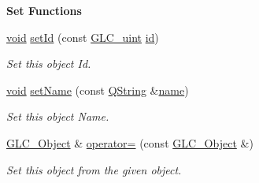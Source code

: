 \begin{Indent}{\bf Set Functions}\par
\begin{DoxyCompactItemize}
\item 
\hyperlink{group___u_a_v_objects_plugin_ga444cf2ff3f0ecbe028adce838d373f5c}{void} \hyperlink{class_g_l_c___object_a4cfaa3b2d34169a3b39912ca953d9042}{set\-Id} (const \hyperlink{glc__global_8h_abf950976fabed69026558df8e2da6c6b}{G\-L\-C\-\_\-uint} \hyperlink{glext_8h_a58c2a664503e14ffb8f21012aabff3e9}{id})
\begin{DoxyCompactList}\small\item\em Set this object Id. \end{DoxyCompactList}\item 
\hyperlink{group___u_a_v_objects_plugin_ga444cf2ff3f0ecbe028adce838d373f5c}{void} \hyperlink{class_g_l_c___object_a8a6dad86d79d8353056106f4d1cc099b}{set\-Name} (const \hyperlink{group___u_a_v_objects_plugin_gab9d252f49c333c94a72f97ce3105a32d}{Q\-String} \&\hyperlink{glext_8h_ad977737dfc9a274a62741b9500c49a32}{name})
\begin{DoxyCompactList}\small\item\em Set this object Name. \end{DoxyCompactList}\item 
\hyperlink{class_g_l_c___object}{G\-L\-C\-\_\-\-Object} \& \hyperlink{class_g_l_c___object_a0a7177e9383f417c53ef7934dc4c5d16}{operator=} (const \hyperlink{class_g_l_c___object}{G\-L\-C\-\_\-\-Object} \&)
\begin{DoxyCompactList}\small\item\em Set this object from the given object. \end{DoxyCompactList}\end{DoxyCompactItemize}
\end{Indent}

